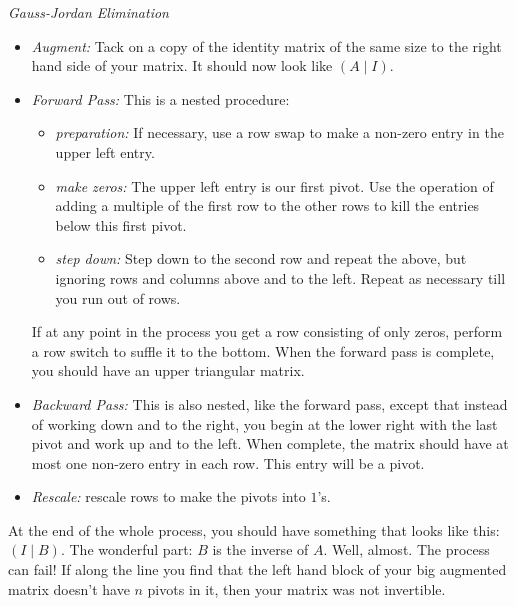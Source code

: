 \documentclass[10pt,]{book}
\theoremstyle{plain}
\numberwithin{equation}{section}
\begin{document}
        \emph{Gauss-Jordan Elimination}
\begin{itemize}
\item{}
          \emph{Augment:} Tack on a copy of the identity matrix of the same
          size to the right hand side of your matrix. It should now look like
          \((A \mid I)\).
        \item{}
          \emph{Forward Pass:} This is a nested procedure:
          \begin{itemize}
\item{}
              \emph{preparation:} If necessary, use a row swap to make a
              non-zero entry in the upper left entry.
            \item{}
              \emph{make zeros:} The upper left entry is our first pivot. Use
              the operation of adding a multiple of the first row to the other
              rows to kill the entries below this first pivot.
            \item{}
              \emph{step down:} Step down to the second row and repeat the
              above, but ignoring rows and columns above and to the left. Repeat
              as necessary till you run out of rows.
            \end{itemize}

          If at any point in the process you get a row consisting of only zeros,
          perform a row switch to suffle it to the bottom. When the forward
          pass is complete, you should have an upper triangular matrix.
        \item{}
          \emph{Backward Pass:} This is also nested, like the forward pass,
          except that instead of working down and to the right, you begin at
          the lower right with the last pivot and work up and to the left.
          When complete, the matrix should have at most one non-zero entry in
          each row. This entry will be a pivot.
        \item{}
          \emph{Rescale:} rescale rows to make the pivots into \(1\)'s.
        \end{itemize}
\par

        At the end of the whole process, you should have something that looks
        like this: \((I \mid B)\). The wonderful part: \(B\) is the
        inverse of \(A\). Well, almost. The process can fail! If along the
        line you find that the left hand block of your big augmented matrix
        doesn't have \(n\) pivots in it, then your matrix was not invertible.
\par
\end{document}
